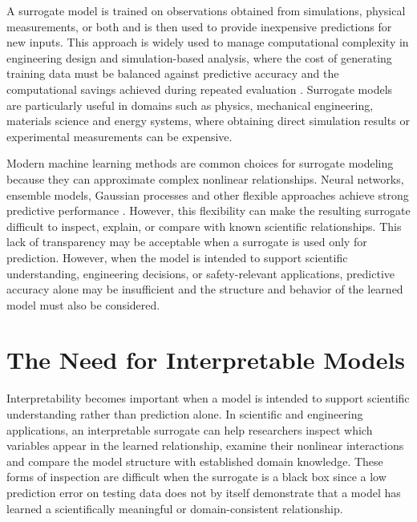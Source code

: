 \documentclass[12pt,oneside,bibtotoc,liststotoc]{scrbook}
\begin{document}
A surrogate model is trained on observations obtained from simulations, physical measurements, or both and is then used to provide inexpensive predictions for new inputs. This approach is widely used to manage computational complexity in engineering design and simulation-based analysis, where the cost of generating training data must be balanced against predictive accuracy and the computational savings achieved during repeated evaluation \cite{alizadeh2020managing}. Surrogate models are particularly useful in domains such as physics, mechanical engineering, materials science and energy systems, where obtaining direct simulation results or experimental measurements can be expensive.

Modern machine learning methods are common choices for surrogate modeling because they can approximate complex nonlinear relationships. Neural networks, ensemble models, Gaussian processes and other flexible approaches achieve strong predictive performance \cite{alizadeh2020managing}. However, this flexibility can make the resulting surrogate difficult to inspect, explain, or compare with known scientific relationships. This lack of transparency may be acceptable when a surrogate is used only for prediction. However, when the model is intended to support scientific understanding, engineering decisions, or safety-relevant applications, predictive accuracy alone may be insufficient and the structure and behavior of the learned model must also be considered.

\section{The Need for Interpretable Models}

Interpretability becomes important when a model is intended to support scientific understanding rather than prediction alone. In scientific and engineering applications, an interpretable surrogate can help researchers inspect which variables appear in the learned relationship, examine their nonlinear interactions and compare the model structure with established domain knowledge. These forms of inspection are difficult when the surrogate is a black box since a low prediction error on testing data does not by itself demonstrate that a model has learned a scientifically meaningful or domain-consistent relationship.

\end{document}
